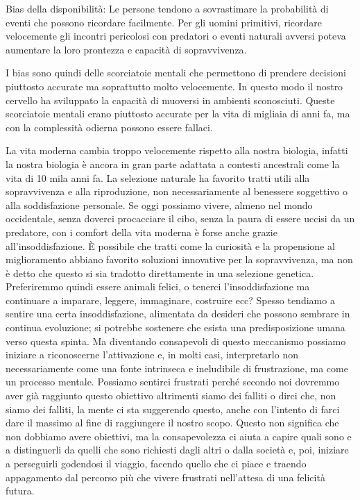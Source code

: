 \documentclass[12pt]{book} %
\begin{document}
Bias della disponibilità: Le persone tendono a sovrastimare la probabilità di eventi che possono ricordare facilmente.
Per gli uomini primitivi, ricordare velocemente gli incontri pericolosi con predatori o eventi naturali avversi poteva
aumentare la loro prontezza e capacità di sopravvivenza.

I bias sono quindi delle scorciatoie mentali che permettono di prendere decisioni piuttosto accurate ma soprattutto
molto velocemente. In questo modo il nostro cervello ha sviluppato la capacità di muoversi in ambienti sconosciuti.
Queste scorciatoie mentali erano piuttosto accurate per la vita di migliaia di anni fa, ma con la complessità odierna
possono essere fallaci.

La vita moderna cambia troppo velocemente rispetto alla nostra biologia, infatti la nostra biologia è ancora in gran parte adattata a contesti ancestrali come la vita di 10 mila anni fa. 
La selezione naturale ha favorito tratti utili alla sopravvivenza e alla riproduzione, non necessariamente al benessere soggettivo o alla soddisfazione personale. Se oggi possiamo
vivere, almeno nel mondo occidentale, senza doverci procacciare il cibo, senza la paura di essere uccisi da un predatore, con
i comfort della vita moderna è forse anche grazie all'insoddisfazione. 
È possibile che tratti come la curiosità e la propensione al miglioramento abbiano favorito soluzioni innovative per la sopravvivenza, ma non è detto che questo si sia tradotto direttamente in una selezione genetica.
Preferiremmo quindi essere animali felici, o tenerci l'insoddisfazione ma continuare a
imparare, leggere, immaginare, costruire ecc? 
Spesso tendiamo a sentire una certa insoddisfazione, alimentata da desideri che possono sembrare in continua evoluzione; si potrebbe sostenere che esista una predisposizione umana verso questa spinta. 
Ma diventando consapevoli di questo meccanismo possiamo iniziare a riconoscerne l'attivazione e, in molti casi, interpretarlo non necessariamente come una fonte intrinseca e ineludibile di frustrazione, ma come un processo mentale.
Possiamo sentirci frustrati perché secondo noi dovremmo aver già raggiunto questo obiettivo altrimenti siamo dei falliti o dirci che, non
siamo dei falliti, la mente ci sta suggerendo questo, anche con l'intento di farci dare il massimo al fine di raggiungere il nostro
scopo. Questo non significa che non dobbiamo avere obiettivi, ma la consapevolezza ci aiuta a capire quali sono e a distinguerli da quelli che sono richiesti dagli altri o dalla società e, poi, iniziare a perseguirli
godendosi il viaggio, facendo quello che ci piace e traendo appagamento dal percorso più che vivere frustrati
nell'attesa di una felicità futura.
\end{document}
